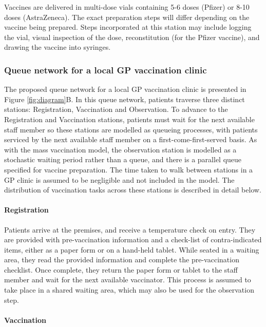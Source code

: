 \documentclass{article}
\begin{document}
Vaccines are delivered in multi-dose vials containing 5-6 doses (Pfizer)
or 8-10 doses (AstraZeneca). The exact preparation steps will differ
depending on the vaccine being prepared. Steps incorporated at this
station may include logging the vial, visual inspection of the dose,
reconstitution (for the Pfizer vaccine), and drawing the vaccine into
syringes.

\hypertarget{queue-network-for-a-local-gp-vaccination-clinic}{%
\subsubsection{Queue network for a local GP vaccination
clinic}\label{queue-network-for-a-local-gp-vaccination-clinic}}

The proposed queue network for a local GP vaccination clinic is
presented in Figure \ref{fig:diagram}B. In this queue network, patients
traverse three distinct stations: Registration, Vaccination and
Observation. To advance to the Registration and Vaccination stations,
patients must wait for the next available staff member so these stations
are modelled as queueing processes, with patients serviced by the next
available staff member on a first-come-first-served basis. As with the
mass vaccination model, the observation station is modelled as a
stochastic waiting period rather than a queue, and there is a parallel
queue specified for vaccine preparation. The time taken to walk between
stations in a GP clinic is assumed to be negligible and not included in
the model. The distribution of vaccination tasks across these stations
is described in detail below.

\hypertarget{registration-1}{%
\paragraph{Registration}\label{registration-1}}

Patients arrive at the premises, and receive a temperature check on
entry. They are provided with pre-vaccination information and a
check-list of contra-indicated items, either as a paper form or on a
hand-held tablet. While seated in a waiting area, they read the provided
information and complete the pre-vaccination checklist. Once complete,
they return the paper form or tablet to the staff member and wait for
the next available vaccinator. This process is assumed to take place in
a shared waiting area, which may also be used for the observation step.

\hypertarget{vaccination-1}{%
\paragraph{Vaccination}\label{vaccination-1}}
\end{document}
